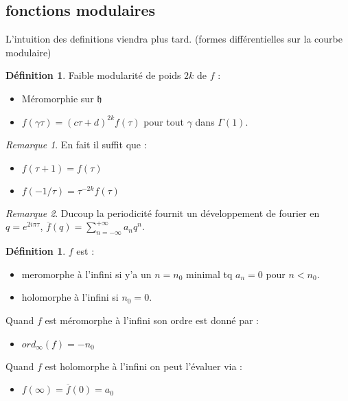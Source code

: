 \documentclass[12pt]{article}
\theoremstyle{plain}
\theoremstyle{definition}
\newtheorem{defn}[subsubsection]{D\'efinition}
\theoremstyle{remark}
\newtheorem{rem}{Remarque}
\newcommand{\h}{\mathfrak{h}}
\begin{document}
\subsection{fonctions modulaires}
L'intuition des definitions viendra plus tard. (formes différentielles sur la courbe modulaire)
\begin{defn}
    Faible modularité de poids $2k$ de $f$ :
    \begin{itemize}
        \item Méromorphie sur $\h$
        \item $f(\gamma\tau)=(c\tau+d)^{2k}f(\tau)$ pour tout $\gamma$ dans $\Gamma(1)$.
    \end{itemize}
\end{defn}

\begin{rem}
    En fait il suffit que :
    \begin{itemize}
        \item $f(\tau+1)=f(\tau)$
        \item $f(-1/\tau)=\tau^{-2k}f(\tau)$
    \end{itemize}
    
\end{rem}

\begin{rem}
    Ducoup la periodicité fournit un développement de fourier en $q=e^{2i\pi\tau}$, $\overline{f}(q)=\sum_{n=-\infty}^{+\infty}a_nq^n$. 
\end{rem}
\begin{defn}
    $f$ est :
    \begin{itemize}
        \item meromorphe à l'infini si y'a un $n=n_0$ minimal tq $a_n=0$ pour $n<n_0$.
        \item holomorphe à l'infini si $n_0=0$.
    \end{itemize}
    Quand $f$ est méromorphe à l'infini son ordre est donné par  :
    \begin{itemize}
        \item $ord_{\infty}(f)=-n_0$
    \end{itemize}
    Quand $f$ est holomorphe à l'infini on peut l'évaluer via :
    \begin{itemize}
        \item $f(\infty)=\overline{f}(0)=a_0$
    \end{itemize}
\end{defn}
\end{document}
